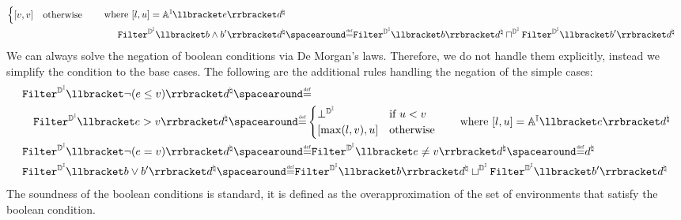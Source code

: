 \begin{description}
\begin{align*}
\begin{cases}
      \interval{\defvalue}{\defvalue} & \text{otherwise}
    \end{cases} \tag*{where $\interval{l}{u} = \intervalaexp \semanticsof{\defaexp} \defabstractvalue$} \\
    \intervalabstractdomainfilter \semanticsof{\defbexp \land \defbexp'} \defabstractvalue &\DefeQ \intervalabstractdomainfilter \semanticsof{\defbexp} \defabstractvalue \intervalabstractdomainmeet \intervalabstractdomainfilter \semanticsof{\defbexp'} \defabstractvalue
  \end{align*}
  We can always solve the negation of boolean conditions via De Morgan's laws.
  Therefore, we do not handle them explicitly, instead we simplify the condition to the base cases. The following are the additional rules handling the negation of the simple cases:
  \begin{align*}
    &\intervalabstractdomainfilter \semanticsof{\neg(\defaexp \le \defvalue)} \defabstractvalue \DefeQ \\
    &\quad\intervalabstractdomainfilter \semanticsof{\defaexp > \defvalue} \defabstractvalue \DefeQ\begin{cases}
      \intervalabstractdomainbottom & \text{if } u < \defvalue \\
      \interval{\max(l, \defvalue)}{u} & \text{otherwise}
    \end{cases} \tag*{where $\interval{l}{u} = \intervalaexp \semanticsof{\defaexp} \defabstractvalue$} \\
    &\intervalabstractdomainfilter \semanticsof{\neg(\defaexp = \defvalue)} \defabstractvalue \DefeQ
    \intervalabstractdomainfilter \semanticsof{\defaexp \neq \defvalue} \defabstractvalue \DefeQ \defabstractvalue \\
    &\intervalabstractdomainfilter \semanticsof{\defbexp \lor \defbexp'} \defabstractvalue \DefeQ \intervalabstractdomainfilter \semanticsof{\defbexp} \defabstractvalue \intervalabstractdomainjoin \intervalabstractdomainfilter \semanticsof{\defbexp'} \defabstractvalue
  \end{align*}
  The soundness of the boolean conditions is standard, it is defined as the overapproximation of the set of environments that satisfy the boolean condition.

\end{description}
